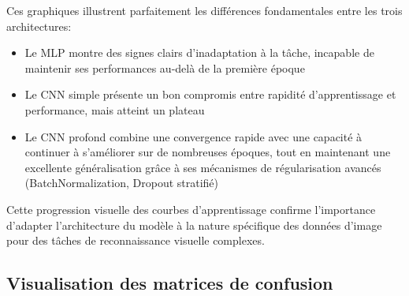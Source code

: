 \bigskip

Ces graphiques illustrent parfaitement les différences fondamentales entre les trois architectures:


\begin{itemize}
\item Le MLP montre des signes clairs d'inadaptation à la tâche, incapable de maintenir ses performances au-delà de la première époque

\item Le CNN simple présente un bon compromis entre rapidité d'apprentissage et performance, mais atteint un plateau

\item Le CNN profond combine une convergence rapide avec une capacité à continuer à s'améliorer sur de nombreuses époques, tout en maintenant une excellente généralisation grâce à ses mécanismes de régularisation avancés (BatchNormalization, Dropout stratifié)
\end{itemize}

\bigskip

Cette progression visuelle des courbes d'apprentissage confirme l'importance d'adapter l'architecture du modèle à la nature spécifique des données d'image pour des tâches de reconnaissance visuelle complexes.


\subsection{Visualisation des matrices de confusion}

